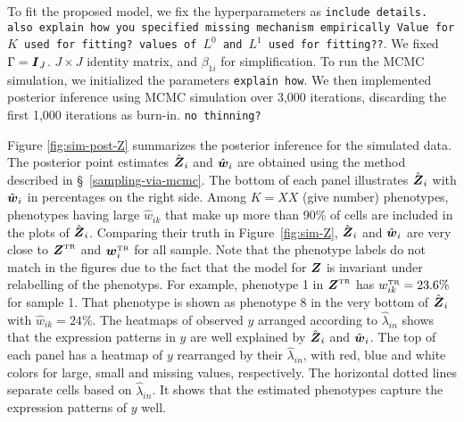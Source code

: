 \documentclass[12pt,]{article}
\def\Z{\bm{Z}}
\newcommand{\true}{{\mbox{\tiny TR}}}
\newcommand{\bZ}{\mbox{\boldmath $Z$}}
\newcommand{\bw}{\mbox{\boldmath $w$}}
\newcommand{\bI}{\mbox{\boldmath $I$}}
\begin{document}
To fit the proposed model, we fix the hyperparameters as
{\tt include details. also explain how you specified missing mechanism empirically Value for $K$ used for fitting? values of $L^0$ and $L^1$ used for fitting??}.
%
We fixed $\Gamma=\bI_J$. $J\times J$ identity matrix, and $\beta_{1i}$ for
simplification. To run the MCMC simulation, we initialized the parameters
{\tt explain how}.
%
We then implemented posterior inference using MCMC simulation
over 3,000 iterations, discarding the first 1,000 iterations as burn-in.
{\tt no thinning?}  
%


Figure \ref{fig:sim-post-Z} summarizes the posterior inference for the simulated data.  The posterior point estimates $\hat{\bZ}_i$ and $\hat{\bw}_i$ are obtained using the method described in \S~\ref{sampling-via-mcmc}.  
%
The bottom of each panel illustrates $\hat{\bZ}_i$ with $\hat{\bw}_i$ in percentages on the right side. Among $K=XX$ (give number) phenotypes, phenotypes having large $\hat{w}_{ik}$ that make up more than 90\% of cells are included in the plots of $\hat{\bZ}_i$.    Comparing their truth in Figure~\ref{fig:sim-Z}, $\hat{\bZ}_i$ and $\hat{\bw}_i$ are very close to $\bZ^\true$ and $\bw_i^\true$ for all sample. Note that the phenotype labels do not match in the figures due to the fact that the model for $\bZ$ is invariant under relabelling of the phenotyps. For example, phenotype 1 in $\bZ^\true$ has $w^\true_{ik}=23.6\%$ for sample 1.  That phenotype is shown as phenotype 8 in the very bottom of $\hat{\bZ}_i$ with $\hat{w}_{ik}=24\%$.   %
The heatmaps of observed $y$ arranged according to $\hat{\lambda}_{in}$ shows that the expression patterns in $y$ are well explained by $\hat{\bZ}_i$ and $\hat{\bw}_i$.  The top of each panel has a heatmap of $y$ rearranged by their $\hat{\lambda}_{in}$, with red, blue and white colors for large, small and missing values, respectively.  The horizontal dotted lines separate cells based on $\hat{\lambda}_{in}$.  It shows that the estimated phenotypes capture the expression patterns of $y$ well.    
\end{document}
